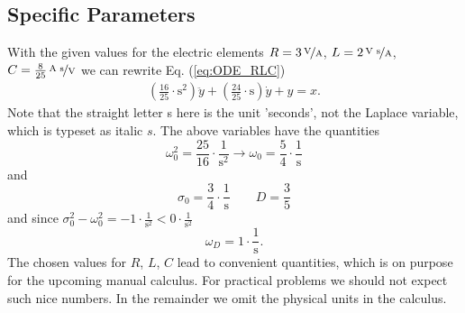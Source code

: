 \documentclass[a4paper,11pt,oneside]{scrartcl}
\newcommand{\eq}[1]{Eq. (\ref{#1})}
\begin{document}
\subsection{Specific Parameters}
With the given values for the electric elements
$R = 3\,\nicefrac{\text{V}}{\text{A}}$,
$L=2\,\nicefrac{\text{V s}}{\text{A}}$,
$C=\frac{8}{25}\,\nicefrac{\text{A s}}{\text{V}}$
we can rewrite \eq{eq:ODE_RLC}
\begin{align}
\boxed{
(\frac{16}{25} \cdot \text{s}^2) \ddot{y} + (\frac{24}{25} \cdot \text{s})
\dot{y} + y = x.
}
\end{align}
Note that the straight letter s here is the unit 'seconds', not the Laplace
variable, which is typeset as italic $s$.
%
The above variables have the quantities
\begin{equation}
\omega_0^2 = \frac{25}{16} \cdot \frac{1}{\text{s}^2}
\rightarrow \omega_0 = \frac{5}{4} \cdot \frac{\text{1}}{\text{s}}
\end{equation}
and
\begin{equation}
\sigma_0 = \frac{3}{4}\cdot \frac{\text{1}}{\text{s}}
\qquad D = \frac{3}{5}
\end{equation}
and since $\sigma_0^2 - \omega_0^2 = -1 \cdot \frac{1}{\text{s}^2}< 0\cdot \frac{1}{\text{s}^2}$
\begin{equation}
\omega_D = 1 \cdot \frac{\text{1}}{\text{s}}.
\end{equation}
%
The chosen values for $R$, $L$, $C$ lead to convenient quantities, which is on
purpose for the upcoming manual calculus. For practical problems we should not
expect such nice numbers.
%
In the remainder we omit the physical units in the calculus.


\end{document}
